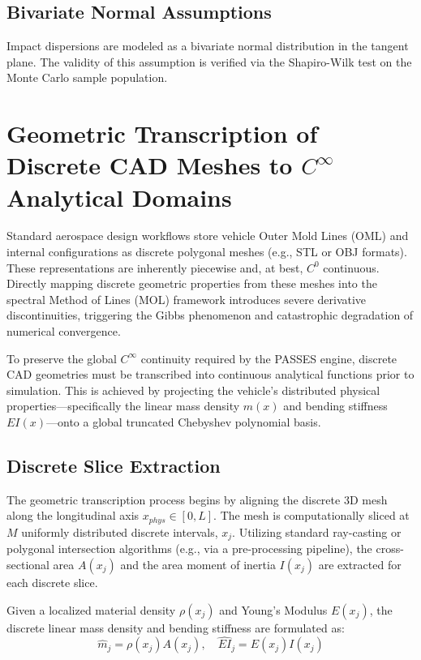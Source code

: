 \documentclass[11pt,a4paper]{article}
\theoremstyle{definition}
\numberwithin{equation}{section}
\begin{document}
\begin{appendices}
\subsection{Bivariate Normal Assumptions}
Impact dispersions are modeled as a bivariate normal distribution in the tangent plane. The validity of this assumption is verified via the Shapiro-Wilk test on the Monte Carlo sample population.

\section{Geometric Transcription of Discrete CAD Meshes to $C^\infty$ Analytical Domains}
\label{app:geometry}

Standard aerospace design workflows store vehicle Outer Mold Lines (OML) and internal configurations as discrete polygonal meshes (e.g., STL or OBJ formats). These representations are inherently piecewise and, at best, $C^0$ continuous. Directly mapping discrete geometric properties from these meshes into the spectral Method of Lines (MOL) framework introduces severe derivative discontinuities, triggering the Gibbs phenomenon and catastrophic degradation of numerical convergence. 

To preserve the global $C^\infty$ continuity required by the PASSES engine, discrete CAD geometries must be transcribed into continuous analytical functions prior to simulation. This is achieved by projecting the vehicle's distributed physical properties—specifically the linear mass density $m(x)$ and bending stiffness $EI(x)$—onto a global truncated Chebyshev polynomial basis.

\subsection{Discrete Slice Extraction}
The geometric transcription process begins by aligning the discrete 3D mesh along the longitudinal axis $x_{phys} \in [0, L]$. The mesh is computationally sliced at $M$ uniformly distributed discrete intervals, $x_j$. Utilizing standard ray-casting or polygonal intersection algorithms (e.g., via a pre-processing pipeline), the cross-sectional area $A(x_j)$ and the area moment of inertia $I(x_j)$ are extracted for each discrete slice. 

Given a localized material density $\rho(x_j)$ and Young's Modulus $E(x_j)$, the discrete linear mass density and bending stiffness are formulated as:
\begin{equation}
    \hat{m}_j = \rho(x_j) A(x_j), \quad \widehat{EI}_j = E(x_j) I(x_j)
\end{equation}


\end{appendices}
\end{document}
